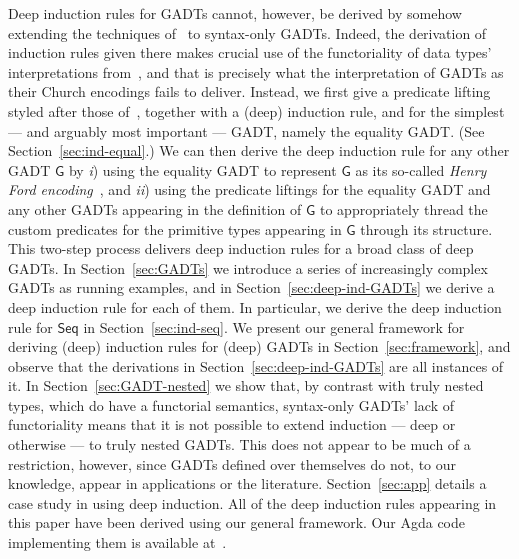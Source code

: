 \documentclass[9pt]{entcs}
\begin{document}
Deep induction rules for GADTs cannot, however, be derived by somehow
extending the techniques of~\cite{jp20} to syntax-only GADTs. Indeed,
the derivation of induction rules given there makes crucial use of the
functoriality of data types' interpretations from~\cite{jp19}, and
that is precisely what the interpretation of GADTs as their Church
encodings fails to deliver. Instead, we first give a predicate lifting
styled after those of~\cite{jp20}, together with a (deep) induction
rule, and for the simplest --- and arguably most important --- GADT,
namely the equality GADT. (See Section~\ref{sec:ind-equal}.) We can
then derive the deep induction rule for any other GADT $\mathsf{G}$ by
{\em i}) using the equality GADT to represent $\mathsf{G}$ as its
so-called {\em Henry Ford
  encoding}~\cite{ch03,hin03,mcb99,sjsv09,sp04}, and {\em ii}) using
the predicate liftings for the equality GADT and any other GADTs
appearing in the definition of $\mathsf{G}$ to appropriately thread
the custom predicates for the primitive types appearing in
$\mathsf{G}$ through its structure. This two-step process delivers
deep induction rules for a broad class of deep GADTs. In
Section~\ref{sec:GADTs} we introduce a series of increasingly complex
GADTs as running examples, and in Section~\ref{sec:deep-ind-GADTs} we
derive a deep induction rule for each of them. In particular, we
derive the deep induction rule for $\mathsf{Seq}$ in
Section~\ref{sec:ind-seq}. We present our general framework for
deriving (deep) induction rules for (deep) GADTs in
Section~\ref{sec:framework}, and observe that the derivations in
Section~\ref{sec:deep-ind-GADTs} are all instances of it.  In
Section~\ref{sec:GADT-nested} we show that, by contrast with truly
nested types, which do have a functorial semantics, syntax-only GADTs'
lack of functoriality means that it is not possible to extend
induction --- deep or otherwise --- to truly nested GADTs. This does
not appear to be much of a restriction, however, since GADTs defined
over themselves do not, to our knowledge, appear in applications or
the literature. Section~\ref{sec:app} details a case study in using
deep induction. All of the deep induction rules appearing in this
paper have been derived using our general framework. Our Agda code
implementing them is available at~\cite{web-page}.


\vspace*{0.05in}
\end{document}
